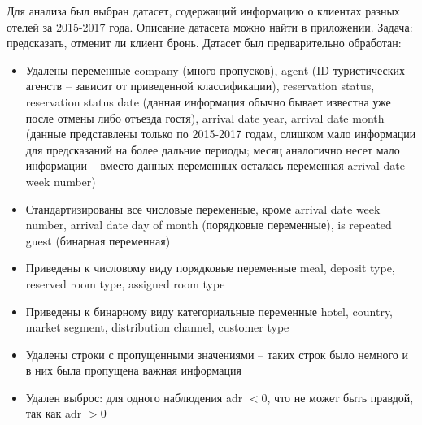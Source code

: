 Для анализа был выбран датасет, содержащий информацию о клиентах разных отелей за 2015-2017 года. Описание датасета можно найти в \hyperref[sec:app1]{приложении}. Задача: предсказать, отменит ли клиент бронь. Датасет был предварительно обработан:
\begin{itemize}
	\item Удалены переменные company (много пропусков), agent (ID туристических агенств -- зависит от приведенной классификации), reservation status, reservation status date (данная информация обычно бывает известна уже после отмены либо отъезда гостя), arrival date year, arrival date month (данные представлены только по 2015-2017 годам, слишком мало информации для предсказаний на более дальние периоды; месяц аналогично несет мало информации -- вместо данных переменных осталась переменная arrival date week number)
	\item Стандартизированы все числовые переменные, кроме arrival date week number, arrival date day of month (порядковые переменные), is repeated guest (бинарная переменная)
	\item Приведены к числовому виду порядковые переменные meal, deposit type, reserved room type, assigned room type
	\item Приведены к бинарному виду категориальные переменные hotel, country, market segment, distribution channel, customer type
	\item Удалены строки с пропущенными значениями -- таких строк было немного и в них была пропущена важная информация
	\item Удален выброс: для одного наблюдения adr $<0$, что не может быть правдой, так как adr $> 0$
\end{itemize}